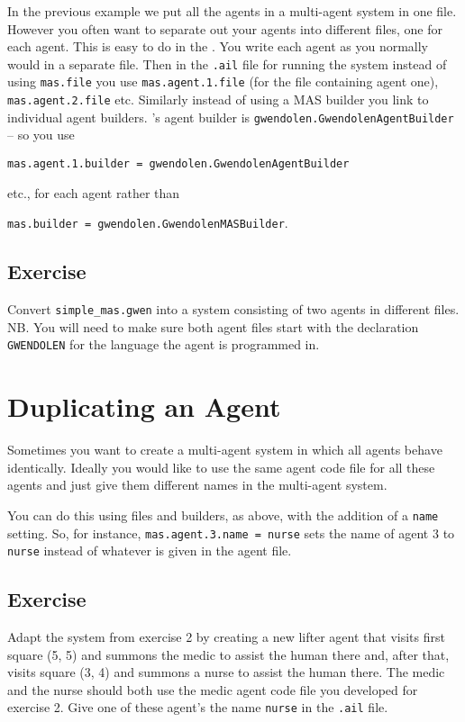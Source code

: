 \documentclass[a4]{article}
\begin{document}
In the previous example we put all the agents in a multi-agent system in one file.  However you often want to separate out your agents into different files, one for each agent.  This is easy to do in the \ail.  You write each agent as you normally would in a separate file.  Then in the \texttt{.ail} file for running the system instead of using \texttt{mas.file} you use \texttt{mas.agent.1.file} (for the file containing agent one), \texttt{mas.agent.2.file} etc.  Similarly instead of using a MAS builder you link to individual agent builders.  \gwendolen's agent builder is \texttt{gwendolen.GwendolenAgentBuilder} -- so you use 
\begin{center}
\texttt{mas.agent.1.builder = gwendolen.GwendolenAgentBuilder} 
\end{center}
etc., for each agent rather than 
\begin{center}
\texttt{mas.builder = gwendolen.GwendolenMASBuilder}.
\end{center}

\subsection{Exercise}
Convert \texttt{simple\_mas.gwen} into a system consisting of two agents in different files.  NB.  You will need to make sure both agent files start with the declaration \texttt{GWENDOLEN} for the language the agent is programmed in.

\section{Duplicating an Agent}

Sometimes you want to create a multi-agent system in which all agents behave identically.  Ideally you would like to use the same agent code file for all these agents and just give them different names in the multi-agent system.

You can do this using files and builders, as above, with the addition of a \texttt{name} setting.  So, for instance, \texttt{mas.agent.3.name = nurse} sets the name of agent 3 to \texttt{nurse} instead of whatever is given in the agent file.

\subsection{Exercise}
Adapt the system from exercise 2 by creating a new lifter agent that visits first square (5, 5) and summons the medic to assist the human there and, after that, visits square (3, 4) and summons a nurse to assist the human there.  The medic and the nurse should both use the medic agent code file you developed for exercise 2.  Give one of these agent's the name \texttt{nurse} in the \texttt{.ail} file.
\end{document}
